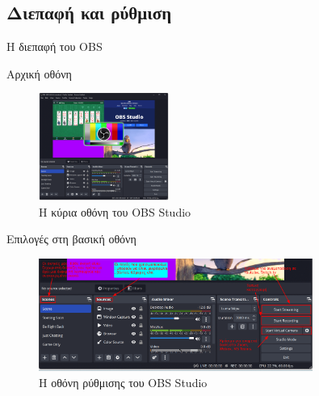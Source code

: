 \documentclass[aspectratio=169]{beamer}
\begin{document}
\subsection{Διεπαφή και ρύθμιση}
\begin{frame}[allowframebreaks]{Η διεπαφή του OBS}
  \begin{block}{Αρχική οθόνη}
    \begin{figure}
      \includegraphics[width=0.38\textwidth]{images/screenshot_obs.png}
      \caption{Η κύρια οθόνη του OBS Studio}
      \label{fig:obs_interface}
    \end{figure}
  \end{block}
  \begin{block}{Επιλογές στη βασική οθόνη}
    \begin{figure}
      \includegraphics[width=0.8\textwidth]{images/obs_tools.png}
      \caption{Η οθόνη ρύθμισης του OBS Studio}
      \label{fig:obs_interface2}
    \end{figure}
  \end{block}
\end{frame}
\end{document}
